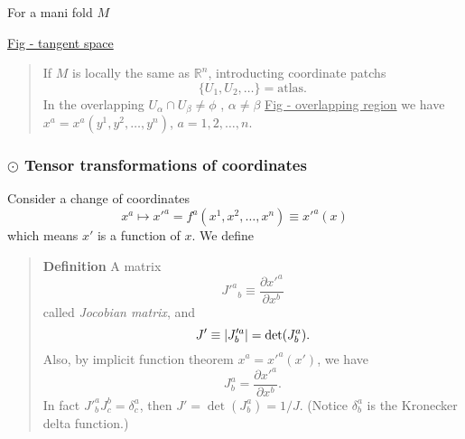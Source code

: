 
For a mani fold $M$

\underline{Fig - tangent space}



\begin{quote}
	If $M$ is locally the same as $\mathbb{R}^n$, introducting coordinate patchs
\begin{equation}
\{U_1,U_2,\ldots\} = \text{atlas.}
\end{equation}
In the overlapping $U_\alpha \cap U_\beta \neq \phi$ , $\alpha\neq\beta$
\underline{Fig - overlapping region}
we have $x^{a} = x^{a}(y^1,y^2,\ldots,y^n)$, $a=1,2,\ldots,n$.
\end{quote}

\subsubsection{$\odot$ Tensor transformations of coordinates} %

Consider a change of coordinates
\begin{equation}
x^{a}\mapsto x'^{a} = f^{a} (x^1,x^2,\ldots,x^n)\equiv x'^{a}(x)
\end{equation}
which means $x'$ is a function of $x$. We define

\begin{quote}
	\textbf{Definition}
A matrix
\begin{equation}
{J'^{a}}_{b} \equiv \frac{\partial x'^{a}}{\partial x^{b}}
\end{equation}
called \textit{Jocobian matrix}, and
\begin{equation}
J'\equiv \abs{J'^{a}_{b}} = \det(J^{a}_{b}).
\end{equation}
Also, by implicit function theorem $x^{a} = x'^{a}(x')$, we have
\begin{equation}
J^{a}_{b} = \frac{\partial x'^{a}}{\partial x^{b}}.
\end{equation}
In fact $J'^{a}_{b}J^{b}_{c} = \delta^{a}_{c}$, then $J' = \det(J^{a}_{b}) = 1/J$. (Notice $\delta^{a}_{b}$ is the Kronecker delta function.)
\end{quote}

